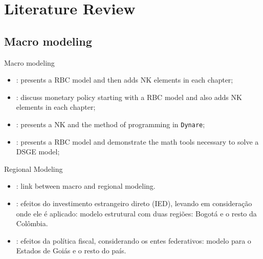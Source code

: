 \documentclass[presentation.tex]{subfiles}
\begin{document}
\section{Literature Review}


\subsection{Macro modeling}

\begin{frame}[fragile]{Macro modeling}
	
	\begin{itemize}
		
		\item \textcite{costa_junior_understanding_2016}: presents a RBC model and then adds NK elements in each chapter;
		
		\item \textcite{gali_monetary_2015}: discuss monetary policy starting with a RBC model and also adds NK elements in each chapter;
		
		\item \textcite{bergholt_basic_2012}: presents a NK and the method of programming in \texttt{Dynare};
		
		\item \textcite{solis-garcia_ucb_2022}: presents a RBC model and demonstrate the math tools necessary to solve a DSGE model;
				
	\end{itemize}
	
\end{frame}


\begin{frame}[fragile]{Regional Modeling}

\begin{itemize}

	\item \textcite{rickman_modern_2010}: link between macro and regional modeling.

	\item \textcite{mora_fdi_2019}: efeitos do investimento estrangeiro direto (IED), levando em consideração onde ele é aplicado: modelo estrutural com duas regiões: Bogotá e o resto da Colômbia.

	\item \textcite{costa_junior_dsge_2022}: efeitos da política fiscal, considerando os entes federativos: modelo para o Estados de Goiás e o resto do país.
	
\end{itemize}
		
\end{frame}
\end{document}
